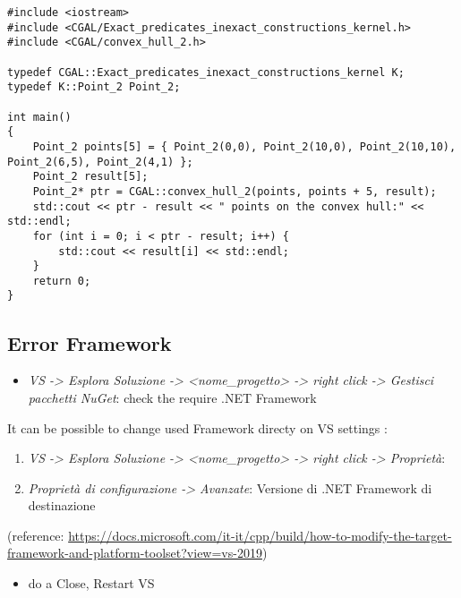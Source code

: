 \documentclass[10pt, english, openany]{report}
\begin{document}
\begin{appendices}
\begin{lstlisting}
#include <iostream>
#include <CGAL/Exact_predicates_inexact_constructions_kernel.h>
#include <CGAL/convex_hull_2.h>

typedef CGAL::Exact_predicates_inexact_constructions_kernel K;
typedef K::Point_2 Point_2;
    
int main()
{
	Point_2 points[5] = { Point_2(0,0), Point_2(10,0), Point_2(10,10), Point_2(6,5), Point_2(4,1) };
	Point_2 result[5];
	Point_2* ptr = CGAL::convex_hull_2(points, points + 5, result);
	std::cout << ptr - result << " points on the convex hull:" << std::endl;
	for (int i = 0; i < ptr - result; i++) {
		std::cout << result[i] << std::endl;
	}
	return 0;
}
\end{lstlisting}

\subsection{Error Framework}
\begin{itemize}
\item \textit{VS -> Esplora Soluzione -> <nome\_progetto> -> right click -> Gestisci pacchetti NuGet}: check the require .NET Framework
\end{itemize}
It can be possible to change used Framework directy on VS settings :
\begin{enumerate}
\item \textit{VS -> Esplora Soluzione -> <nome\_progetto> -> right click -> Proprietà}:
\item \textit{Proprietà di configurazione -> Avanzate}: Versione di .NET Framework di destinazione
\end{enumerate}
(reference: \href{https://docs.microsoft.com/it-it/cpp/build/how-to-modify-the-target-framework-and-platform-toolset?view=vs-2019}{https://docs.microsoft.com/it-it/cpp/build/how-to-modify-the-target-framework-and-platform-toolset?view=vs-2019})
\begin{itemize}
\item do a Close, Restart VS
\end{itemize}


\end{appendices}
\end{document}
